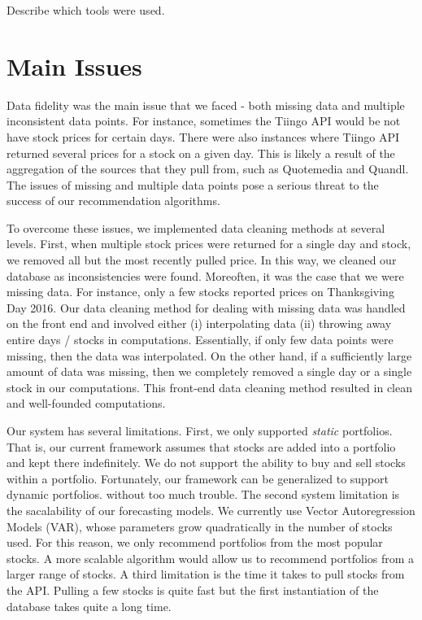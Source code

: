 \documentclass{article}
\begin{document}
Describe which tools were used.

\section{Main Issues}
Data fidelity was the main issue that we faced - both missing data and multiple inconsistent data points. For instance, sometimes the Tiingo API would be not have stock prices for certain days. There were also instances where Tiingo API returned several prices for a stock on a given day. This is likely a result of the aggregation of the sources that they pull from, such as Quotemedia and Quandl. The issues of missing and multiple data points pose a serious threat to the success of our recommendation algorithms.

To overcome these issues, we implemented data cleaning methods at several levels. First, when multiple stock prices were returned for a single day and stock, we removed all but the most recently pulled price. In this way, we cleaned our database as inconsistencies were found. Moreoften, it was the case that we were missing data. For instance, only a few stocks reported prices on Thanksgiving Day 2016. Our data cleaning method for dealing with missing data was handled on the front end and involved either (i) interpolating data (ii) throwing away entire days / stocks in computations. Essentially, if only few data points were missing, then the data was interpolated. On the other hand, if a sufficiently large amount of data was missing, then we completely removed a single day or a single stock in our computations. This front-end data cleaning method resulted in clean and well-founded computations.

Our system has several limitations. First, we only supported \emph{static} portfolios. That is, our current framework assumes that stocks are added into a portfolio and kept there indefinitely. We do not support the ability to buy and sell stocks within a portfolio. Fortunately, our framework can be generalized to support dynamic portfolios. without too much trouble. The second system limitation is the sacalability of our forecasting models. We currently use Vector Autoregression Models (VAR), whose parameters grow quadratically in the number of stocks used. For this reason, we only recommend portfolios from the most popular stocks. A more scalable algorithm would allow us to recommend portfolios from a larger range of stocks. A third limitation is the time it takes to pull stocks from the API. Pulling a few stocks is quite fast but the first instantiation of the database takes quite a long time.
\end{document}
